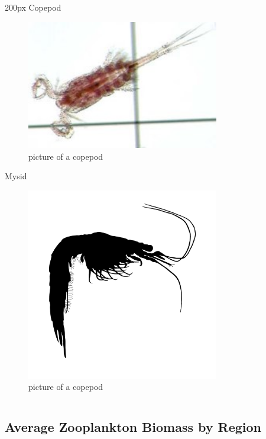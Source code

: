 \documentclass[
]{book}
\begin{document}
\begin{column}{200px\textwidth}
Copepod

\begin{figure}

{\centering \includegraphics[width=3.31in]{figures/copepod} 

}

\caption{picture of a copepod}\label{fig:unnamed-chunk-112}
\end{figure}

Mysid

\begin{figure}

{\centering \includegraphics[width=3.31in]{figures/mysid} 

}

\caption{picture of a copepod}\label{fig:unnamed-chunk-113}
\end{figure}
\end{column}

\hypertarget{average-zooplankton-biomass-by-region-2}{%
\subsection{Average Zooplankton Biomass by Region}\label{average-zooplankton-biomass-by-region-2}}
\end{document}
